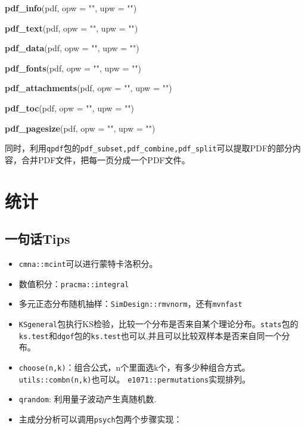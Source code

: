 \documentclass[
]{book}
\newenvironment{Shaded}{\begin{snugshade}}{\end{snugshade}}
\newcommand{\DataTypeTok}[1]{\textcolor[rgb]{0.13,0.29,0.53}{#1}}
\newcommand{\KeywordTok}[1]{\textcolor[rgb]{0.13,0.29,0.53}{\textbf{#1}}}
\newcommand{\NormalTok}[1]{#1}
\newcommand{\StringTok}[1]{\textcolor[rgb]{0.31,0.60,0.02}{#1}}
\providecommand{\tightlist}{%
  \setlength{\itemsep}{0pt}\setlength{\parskip}{0pt}}
\begin{document}
\begin{Shaded}
\begin{Highlighting}[]
\KeywordTok{pdf_info}\NormalTok{(pdf, }\DataTypeTok{opw =} \StringTok{""}\NormalTok{, }\DataTypeTok{upw =} \StringTok{""}\NormalTok{)}

\KeywordTok{pdf_text}\NormalTok{(pdf, }\DataTypeTok{opw =} \StringTok{""}\NormalTok{, }\DataTypeTok{upw =} \StringTok{""}\NormalTok{)}

\KeywordTok{pdf_data}\NormalTok{(pdf, }\DataTypeTok{opw =} \StringTok{""}\NormalTok{, }\DataTypeTok{upw =} \StringTok{""}\NormalTok{)}

\KeywordTok{pdf_fonts}\NormalTok{(pdf, }\DataTypeTok{opw =} \StringTok{""}\NormalTok{, }\DataTypeTok{upw =} \StringTok{""}\NormalTok{)}

\KeywordTok{pdf_attachments}\NormalTok{(pdf, }\DataTypeTok{opw =} \StringTok{""}\NormalTok{, }\DataTypeTok{upw =} \StringTok{""}\NormalTok{)}

\KeywordTok{pdf_toc}\NormalTok{(pdf, }\DataTypeTok{opw =} \StringTok{""}\NormalTok{, }\DataTypeTok{upw =} \StringTok{""}\NormalTok{)}

\KeywordTok{pdf_pagesize}\NormalTok{(pdf, }\DataTypeTok{opw =} \StringTok{""}\NormalTok{, }\DataTypeTok{upw =} \StringTok{""}\NormalTok{)}
\end{Highlighting}
\end{Shaded}

同时，利用\texttt{qpdf}包的\texttt{pdf\_subset,pdf\_combine,pdf\_split}可以提取PDF的部分内容，合并PDF文件，把每一页分成一个PDF文件。

\hypertarget{ux7edfux8ba1}{%
\chapter{统计}\label{ux7edfux8ba1}}

\hypertarget{ux4e00ux53e5ux8bddtips-2}{%
\section{一句话Tips}\label{ux4e00ux53e5ux8bddtips-2}}

\begin{itemize}
\tightlist
\item
  \texttt{cmna::mcint}可以进行蒙特卡洛积分。
\item
  数值积分：\texttt{pracma::integral}
\item
  多元正态分布随机抽样：\texttt{SimDesign::rmvnorm}，还有\texttt{mvnfast}
\item
  \texttt{KSgeneral}包执行KS检验，比较一个分布是否来自某个理论分布。\texttt{stats}包的\texttt{ks.test}和\texttt{dgof}包的\texttt{ks.test}也可以,并且可以比较双样本是否来自同一个分布。
\item
  \texttt{choose(n,k)}：组合公式，n个里面选k个，有多少种组合方式。\texttt{utils::combn(n,k)}也可以。 \texttt{e1071::permutations}实现排列。
\item
  \texttt{qrandom}: 利用量子波动产生真随机数.
\item
  主成分分析可以调用\texttt{psych}包两个步骤实现：
\end{itemize}
\end{document}
